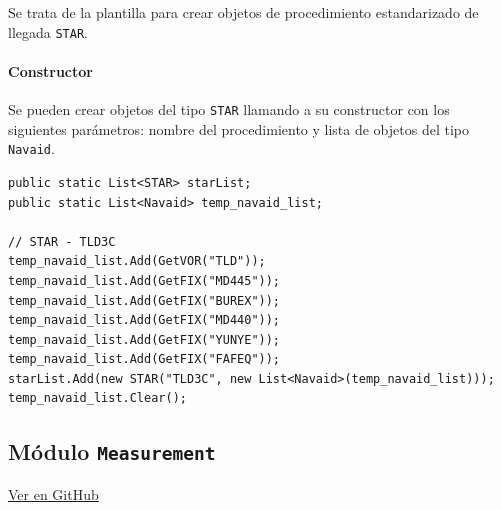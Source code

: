 Se trata de la plantilla para crear objetos de procedimiento estandarizado de llegada \texttt{STAR}.

\paragraph{Constructor} \phantom{\newline}

Se pueden crear objetos del tipo \texttt{STAR} llamando a su constructor con los siguientes parámetros: nombre del procedimiento y lista de objetos del tipo \texttt{Navaid}.

\begin{table}[!hbtp]
	\caption{Ejemplo de instancia al constructor de la clase \texttt{STAR}.}
	\label{tab:EjemploSTAR}
\end{table}
\vspace{-0.8cm}
\begin{scriptsize}
\begin{Verbatim}[frame=single]
public static List<STAR> starList;
public static List<Navaid> temp_navaid_list;

// STAR - TLD3C
temp_navaid_list.Add(GetVOR("TLD"));
temp_navaid_list.Add(GetFIX("MD445"));
temp_navaid_list.Add(GetFIX("BUREX"));
temp_navaid_list.Add(GetFIX("MD440"));
temp_navaid_list.Add(GetFIX("YUNYE"));
temp_navaid_list.Add(GetFIX("FAFEQ"));
starList.Add(new STAR("TLD3C", new List<Navaid>(temp_navaid_list)));
temp_navaid_list.Clear();
\end{Verbatim}
\end{scriptsize}






\clearpage

\subsection{Módulo \texttt{Measurement}}
\label{subsec:ClaseMeasurement}

\vspace{-0.85cm}
\begin{flushright}
\href{https://github.com/macgyver912/atc-simulator/blob/jaime/Assets/Scripts/utils/Measurement.cs}{Ver en GitHub \faGithub}
\end{flushright}

